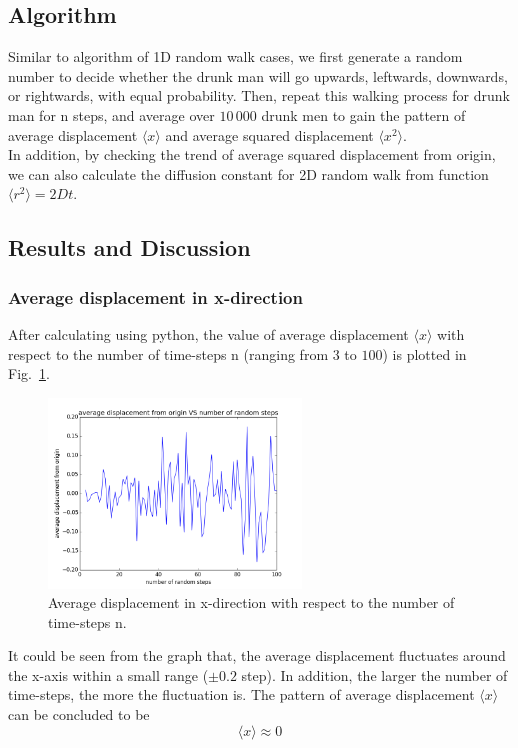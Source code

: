 \documentclass[a4paper,12pt]{article}
\begin{document}
\subsection{Algorithm}
Similar to algorithm of 1D random walk cases, we first generate a random number to decide whether the drunk man will go upwards, leftwards, downwards, or rightwards, with equal probability. Then, repeat this walking process for drunk man for n steps, and average over $10\,000$ drunk men to gain the pattern of average displacement $\langle x \rangle$ and average squared displacement $\langle x^2 \rangle$. \\
In addition, by checking the trend of average squared displacement from origin, we can also calculate the diffusion constant for 2D random walk from function $\langle r^2 \rangle = 2Dt$.

\subsection{Results and Discussion}
\subsubsection{Average displacement in x-direction}
After calculating using python, the value of average displacement $\langle x \rangle$ with respect to the number of time-steps n (ranging from $3$ to $100$) is plotted in Fig.~\ref{Fig:xavg}. \\
\begin{figure}[!htb]
 \centering
  \includegraphics[width=0.6\textwidth]{pics/xavg.png}
  \caption{Average displacement in x-direction with respect to the number of time-steps n.}
  \label{Fig:xavg}
\end{figure}
It could be seen from the graph that, the average displacement fluctuates around the x-axis within a small range ($\pm 0.2$ step). In addition, the larger the number of time-steps, the more the fluctuation is. The pattern of average displacement $\langle x \rangle$ can be concluded to be $$\langle x \rangle \approx 0$$
\end{document}

